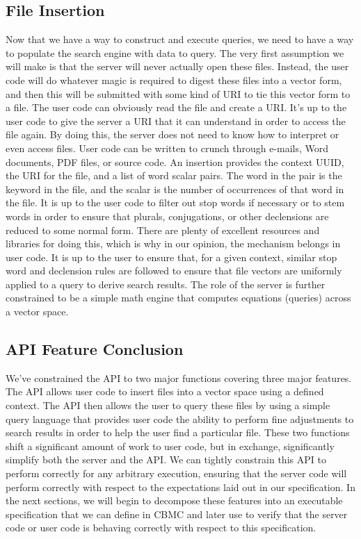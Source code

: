 \subsection{File Insertion}

Now that we have a way to construct and execute queries, we need to have a way
to populate the search engine with data to query.  The very first assumption we
will make is that the server will never actually open these files.  Instead, the
user code will do whatever magic is required to digest these files into a vector
form, and then this will be submitted with some kind of URI to tie this vector
form to a file.  The user code can obviously read the file and create a URI.
It's up to the user code to give the server a URI that it can understand in
order to access the file again.  By doing this, the server does not need to know
how to interpret or even access files.  User code can be written to crunch
through e-mails, Word documents, PDF files, or source code.  An insertion
provides the context UUID, the URI for the file, and a list of word scalar
pairs. The word in the pair is the keyword in the file, and the scalar is the
number of occurrences of that word in the file.  It is up to the user code to
filter out stop words if necessary or to stem words in order to ensure that
plurals, conjugations, or other declensions are reduced to some normal form.
There are plenty of excellent resources and libraries for doing this, which is
why in our opinion, the mechanism belongs in user code.  It is up to the user to
ensure that, for a given context, similar stop word and declension rules are
followed to ensure that file vectors are uniformly applied to a query to derive
search results. The role of the server is further constrained to be a simple
math engine that computes equations (queries) across a vector space.

\subsection{API Feature Conclusion}

We've constrained the API to two major functions covering three major features.
The API allows user code to insert files into a vector space using a defined
context.  The API then allows the user to query these files by using a simple
query language that provides user code the ability to perform fine adjustments
to search results in order to help the user find a particular file.  These two
functions shift a significant amount of work to user code, but in exchange,
significantly simplify both the server and the API. We can tightly constrain
this API to perform correctly for any arbitrary execution, ensuring that the
server code will perform correctly with respect to the expectations laid out in
our specification. In the next sections, we will begin to decompose these
features into an executable specification that we can define in CBMC and later
use to verify that the server code or user code is behaving correctly with
respect to this specification.

